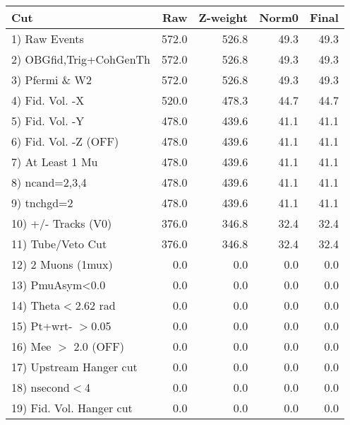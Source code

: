  \begin{table}[h!]\centering
 \begin{tabular}{||l||r|r|r|r||}
 \hline
 \hline
 Cut & Raw & Z-weight & Norm0 & Final \\
 \hline
  1) Raw Events           &       572.0 &       526.8 &        49.3 &        49.3 \\
  2) OBGfid,Trig+CohGenTh &       572.0 &       526.8 &        49.3 &        49.3 \\
  3) Pfermi \& W2         &       572.0 &       526.8 &        49.3 &        49.3 \\
  4) Fid. Vol. -X         &       520.0 &       478.3 &        44.7 &        44.7 \\
  5) Fid. Vol. -Y         &       478.0 &       439.6 &        41.1 &        41.1 \\
  6) Fid. Vol. -Z (OFF)   &       478.0 &       439.6 &        41.1 &        41.1 \\
  7) At Least 1 Mu        &       478.0 &       439.6 &        41.1 &        41.1 \\
  8) ncand=2,3,4          &       478.0 &       439.6 &        41.1 &        41.1 \\
  9) tnchgd=2             &       478.0 &       439.6 &        41.1 &        41.1 \\
 10) +/- Tracks (V0)      &       376.0 &       346.8 &        32.4 &        32.4 \\
 11) Tube/Veto Cut        &       376.0 &       346.8 &        32.4 &        32.4 \\
 12) 2 Muons (1mux)       &         0.0 &         0.0 &         0.0 &         0.0 \\
 13) PmuAsym<0.0          &         0.0 &         0.0 &         0.0 &         0.0 \\
 14) Theta$<$2.62 rad     &         0.0 &         0.0 &         0.0 &         0.0 \\
 15) Pt+wrt- $>$0.05      &         0.0 &         0.0 &         0.0 &         0.0 \\
 16) Mee $>$ 2.0  (OFF)   &         0.0 &         0.0 &         0.0 &         0.0 \\
 17) Upstream Hanger cut  &         0.0 &         0.0 &         0.0 &         0.0 \\
 18) nsecond$<$4          &         0.0 &         0.0 &         0.0 &         0.0 \\
 19) Fid. Vol. Hanger cut &         0.0 &         0.0 &         0.0 &         0.0 \\

\end{tabular}
\end{table}
